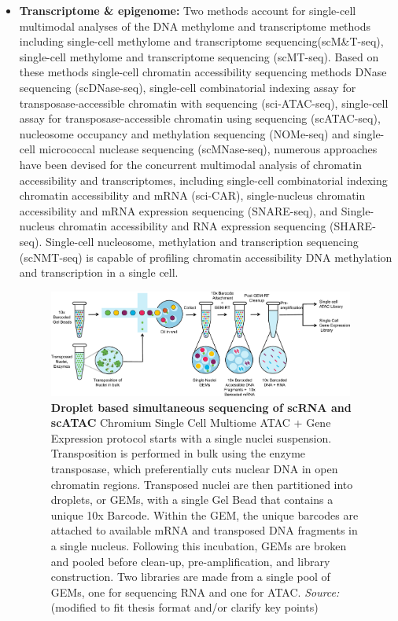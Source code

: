 \begin{itemize}
	\item \textbf{Transcriptome \& epigenome:}
	Two methods account for single-cell multimodal analyses of the DNA methylome and transcriptome methods including single-cell methylome and transcriptome sequencing(scM\&T-seq)\citep{angermueller2016scmntseq}, single-cell methylome and transcriptome sequencing (scMT-seq)\citep{hu2016scmtseq}. Based on these methods single-cell chromatin accessibility sequencing methods DNase sequencing (scDNase-seq), single-cell combinatorial indexing assay for transposase-accessible chromatin with sequencing (sci-ATAC-seq)\citep{cusanovich2015multiplex}, single-cell assay for transposase-accessible chromatin using sequencing (scATAC-seq), nucleosome occupancy and methylation sequencing (NOMe-seq)\citep{kelly2012nomeseq} and single-cell micrococcal nuclease sequencing (scMNase-seq)\citep{lai2018scmnaseseq}, numerous approaches have been devised for the concurrent multimodal analysis of chromatin accessibility and transcriptomes, including single-cell combinatorial indexing chromatin accessibility and mRNA (sci-CAR)\citep{cao2018scicar}, single-nucleus chromatin accessibility and mRNA expression sequencing (SNARE-seq)\citep{chen2019SNARE}, and Single-nucleus chromatin accessibility and RNA expression sequencing (SHARE-seq)\citep{ma2020shareseq}. Single-cell nucleosome, methylation and transcription sequencing (scNMT-seq)\citep{clark2018scnmt} is capable of profiling chromatin accessibility DNA methylation and transcription in a single cell.

	\begin{figure}[!ht]
		\centering
		\includegraphics[width=0.95\textwidth]{droplets_multiome_scRNA_scATAC/fig}
		\vspace{0.1cm}
		\caption[10X Droplets-based simultaneous sequencing of scRNA and scATAC.]{\textbf{Droplet based simultaneous sequencing of scRNA and scATAC} Chromium Single Cell Multiome ATAC + Gene Expression protocol starts with a single nuclei suspension. Transposition is performed in bulk using the enzyme transposase, which preferentially cuts nuclear DNA in open chromatin regions. Transposed nuclei are then partitioned into droplets, or GEMs, with a single Gel Bead that contains a unique 10x Barcode. Within the GEM, the unique barcodes are attached to available mRNA and transposed DNA fragments in a single nucleus. Following this incubation, GEMs are broken and pooled before clean-up, pre-amplification, and library construction. Two libraries are made from a single pool of GEMs, one for sequencing RNA and one for ATAC. \emph{Source: ~\cite{satpathy2019massively}} (modified to fit thesis format and/or clarify key points)}
		\label{fig:droplets_multiome_scRNA_scATAC}
	\end{figure}



\end{itemize}
